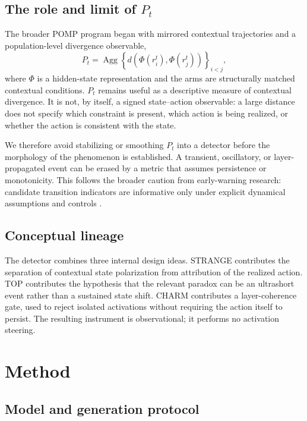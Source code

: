 \documentclass[10pt]{article}
\begin{document}
\subsection{The role and limit of $P_t$}

The broader POMP program began with mirrored contextual trajectories and a population-level divergence observable,
\begin{equation}
P_t = \operatorname{Agg}\left\{d\!\left(\Phi(r_i^t),\Phi(r_j^t)\right)\right\}_{i<j},
\end{equation}
where $\Phi$ is a hidden-state representation and the arms are structurally matched contextual conditions. $P_t$ remains useful as a descriptive measure of contextual divergence. It is not, by itself, a signed state--action observable: a large distance does not specify which constraint is present, which action is being realized, or whether the action is consistent with the state.

We therefore avoid stabilizing or smoothing $P_t$ into a detector before the morphology of the phenomenon is established. A transient, oscillatory, or layer-propagated event can be erased by a metric that assumes persistence or monotonicity. This follows the broader caution from early-warning research: candidate transition indicators are informative only under explicit dynamical assumptions and controls \citep{scheffer2009early}.

\subsection{Conceptual lineage}

The detector combines three internal design ideas. STRANGE contributes the separation of contextual state polarization from attribution of the realized action. TOP contributes the hypothesis that the relevant paradox can be an ultrashort event rather than a sustained state shift. CHARM contributes a layer-coherence gate, used to reject isolated activations without requiring the action itself to persist. The resulting instrument is observational; it performs no activation steering.

\section{Method}

\subsection{Model and generation protocol}
\end{document}
